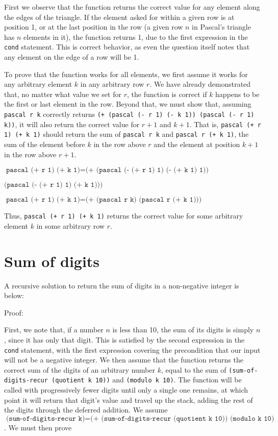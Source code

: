 \documentclass{article}
\begin{document}
First we observe that the function returns the correct value for any element along the edges of the triangle. If the element asked for within a given row is at position 1, or at the last position in the row (a given row $n$ in Pascal's triangle has $n$ elements in it), the function returns 1, due to the first expression in the \texttt{cond} statement. This is correct behavior, as even the question itself notes that any element on the edge of a row will be 1.

To prove that the function works for all elements, we first assume it works for any arbitrary element $k$ in any arbitrary row $r$. We have already demonstrated that, no matter what value we set for $r$, the function is correct if $k$ happens to be the first or last element in the row. Beyond that, we must show that, assuming \texttt{pascal r k} correctly returns \texttt{(+ (pascal (- r 1) (- k 1)) (pascal (- r 1) k))}, it will also return the correct value for $r+1$ and $k+1$. That is, \texttt{pascal (+ r 1) (+ k 1)} should return the sum of \texttt{pascal r k} and \texttt{pascal r (+ k 1)}, the sum of the element before $k$ in the row above $r$ and the element at position $k+1$ in the row above $r+1$.

\begin{center}
  $\texttt{pascal (+ r 1) (+ k 1)} = \texttt{(+ (pascal (- (+ r 1) 1) (- (+ k 1) 1))}$
  
  \hspace{1.85in}$\texttt{(pascal (- (+ r 1) 1) (+ k 1)))}$

  $\texttt{pascal (+ r 1) (+ k 1)} = \texttt{(+ (pascal r k) (pascal r (+ k 1)))}$
\end{center}

Thus, \texttt{pascal (+ r 1) (+ k 1)} returns the correct value for some arbitrary element $k$ in some arbitrary row $r$.

\section*{Sum of digits}

A recursive solution to return the sum of digits in a non-negative integer is below:



Proof:

First, we note that, if a number $n$ is less than 10, the sum of its digits is simply $n$, since it has only that digit. This is satisfied by the second expression in the \texttt{cond} statement, with the first expression covering the precondition that our input will not be a negative integer. We then assume that the function returns the correct sum of the digits of an arbitrary number $k$, equal to the sum of \texttt{(sum-of-digits-recur (quotient k 10))} and \texttt{(modulo k 10)}. The function will be called with progressively fewer digits until only a single one remains, at which point it will return that digit's value and travel up the stack, adding the rest of the digits through the deferred addition. We assume $\texttt{(sum-of-digits-recur k)} = \texttt{(+ (sum-of-digits-recur (quotient k 10)) (modulo k 10)}$. We must then prove 
\end{document}
